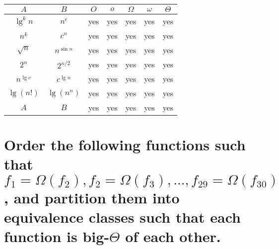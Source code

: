 \begin{center}
	\begin{tabular}{cc|c|c|c|c|c}
		$A$ & $B$ & $O$ & $o$ & $\Omega$ & $\omega$ & $\Theta$ \\ \hline
		$\lg^k n$ & $n^{\epsilon}$ & yes & yes & yes & yes & yes \\ \hline
		$n^k$ & $c^n$ & yes & yes & yes & yes & yes \\ \hline
		$\sqrt{n}$ & $n^{\sin n}$ & yes & yes & yes & yes & yes \\ \hline
		$2^n$ & $2^{n/2}$ & yes & yes & yes & yes & yes \\ \hline
		$n^{\lg c}$ & $c^{\lg n}$ & yes & yes & yes & yes & yes \\ \hline
		$\lg(n!)$ & $\lg(n^n)$ & yes & yes & yes & yes & yes \\ \hline
		$A$ & $B$ & yes & yes & yes & yes & yes
	\end{tabular}
\end{center}

\section[Problem 6]{Order the following functions such that $f_1 = \Omega(f_2), f_2 = \Omega(f_3), ..., f_{29} = \Omega(f_{30})$, and partition them into equivalence classes such that each function is big-$\Theta$ of each other.}
